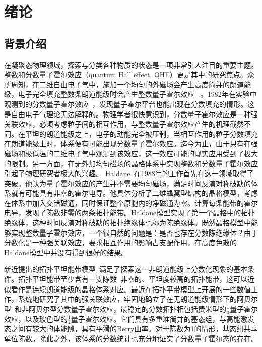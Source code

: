 \chapter{绪论}
\label{introduction}

\section{背景介绍}
在凝聚态物理领域，探索与分类各种物质的状态是一项非常引人注目的重要主题。整数和分数量子霍尔效应（quantum Hall effect, QHE）更是其中的研究焦点。众所周知，在二维自由电子气中，施加一个均匀的外磁场会产生高度简并的朗道能级，电子完全填充整数条朗道能级时会产生整数量子霍尔效应~\cite{Klitzing1980} 。1982年在实验中观测到的分数量子霍尔效应~\cite{Tsui1982}，发现量子霍尔平台也能出现在分数填充的情形。这是自由电子气理论无法解释的。物理学者很快意识到，分数量子霍尔效应是一种强关联效应，必须考虑粒子间的相互作用，与整数量子霍尔效应产生的机理截然不同。在平坦的朗道能级之上，电子的动能完全被压制，当相互作用的粒子分数填充在朗道能级上时，体系便有可能出现分数量子霍尔效应。迄今为止，由于只有在强磁场和极低温的二维电子气中观测到该效应，这一效应可能的现实应用受到了极大的限制。另一方面，在无外加均匀磁场的晶格体系中实现整数和分数量子霍尔效应引起了物理研究者极大的兴趣。
Haldane~\cite{Haldane1988}在1988年的工作首先在这一领域取得了突破。他认为量子霍尔效应的产生并不需要均匀磁场，满足时间反演对称破缺的体系就有可能具有非零的霍尔电导。他具体分析了二维蜂窝型结构的晶格模型，考虑在体系中加入交错磁通，同时保证整个原胞内的净磁通为零。计算每条能带的霍尔电导，发现了陈数非零的两条拓扑能带。Haldane模型实现了第一个晶格中的拓扑绝缘体，这种时间反演对称破缺的拓扑绝缘体也称为陈绝缘体。既然晶格模型中能够实现整数量子霍尔效应，一个很自然的问题是：是否也存在分数陈绝缘体？由于分数化是一种强关联效应，要求相互作用的影响占支配作用，在高度色散的Haldane模型中并没有得到很好的结果。

新近提出的拓扑平坦能带模型~\cite{Tang2011,Sun2011,Neupert2011}满足了探索这一非朗道能级上分数化现象的基本条件。拓扑平坦能带至少含有一支陈数~\cite{Thouless1982}非零的、平坦度较高的拓扑能带，这可以近似看作是连续朗道能级的晶格体系对应。最近在拓扑平带模型上开展的一些数值工作，系统地研究了其中的强关联效应，牢固地确立了在无朗道能级情形下的阿贝尔型~\cite{Sheng2011,Wang2011,Regnault2011}和非阿贝尔型分数量子霍尔效应\cite{Wang2012a,Bernevig2012,Wu2012}，最稳定的分数拓扑相包括费米型的$\frac{1}{3}$量子霍尔效应，以及玻色型的$\frac{1}{2}$量子霍尔效应。它们具有多重准简并的基态组，与高能激发态之间有较大的体能隙，具有平滑的Berry曲率。对于陈数为1的情形，基态组共享单位陈数。除此之外，该体系的分数统计也充分地证实了分数量子霍尔态的存在。

